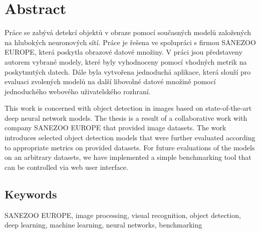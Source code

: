 \chapter*{Abstract}
\noindent

Práce se zabývá detekcí objektů v obraze pomocí současných modelů založených na
hlubokých neuronových sítí. Práce je řešena ve spolupráci s firmou SANEZOO
EUROPE, která poskytla obrazové datové množiny. V práci jsou představeny autorem
vybrané modely, které byly vyhodnoceny pomocí vhodných metrik na poskytnutých
datech. Dále byla vytvořena jednoduchá aplikace, která slouží pro evaluaci
zvolených modelů na další libovolné datové množině pomocí jednoduchého webového
uživatelského rozhraní.

This work is concerned with object detection in images based on state-of-the-art
deep neural network models. The thesis is a result of a collaborative work with
company SANEZOO EUROPE that provided image datasets. The work introduces
selected object detection models that were further evaluated according to
appropriate metrics on provided datasets. For future evaluations of the models
on an arbitrary datasets, we have implemented a simple benchmarking tool that
can be controlled via web user interface.

\section*{Keywords}
\noindent
SANEZOO EUROPE, image processing, visual recognition, object detection, deep
learning, machine learning, neural networks, benchmarking
